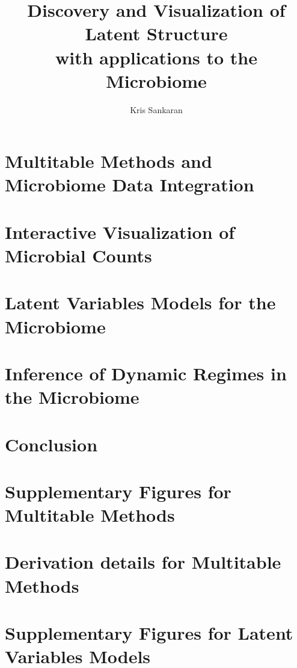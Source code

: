 \documentclass{report}
\title{Discovery and Visualization of Latent Structure \\ with applications to
  the Microbiome}
\author{Kris Sankaran}
\begin{document}
\maketitle
\tableofcontents

\chapter{Multitable Methods and Microbiome Data Integration}
\label{ch:multitable}


\chapter{Interactive Visualization of Microbial Counts}
\label{ch:interactive_vis}


\chapter{Latent Variables Models for the Microbiome}
\label{ch:text_analysis}


\chapter{Inference of Dynamic Regimes in the Microbiome}
\label{ch:dynamic_regimes}


\chapter{Conclusion}

\appendix
\chapter{Supplementary Figures for Multitable Methods}
\label{ch:multitable_supp_figs}


\chapter{Derivation details for Multitable Methods}
\label{ch:multitable_supp_derivations}


\chapter{Supplementary Figures for Latent Variables Models}
\label{ch:lvm_supp_figures}




\end{document}
